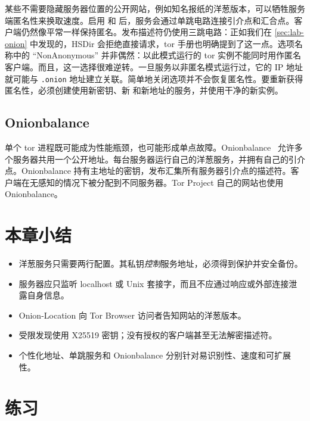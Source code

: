 某些不需要隐藏服务器位置的公开网站，例如知名报纸的洋葱版本，可以牺牲服务端匿名性来换取速度。启用  和  后，服务会通过单跳电路连接引介点和汇合点。客户端仍然像平常一样保持匿名。发布描述符仍使用三跳电路：正如我们在 \cref{sec:lab-onion} 中发现的，HSDir 会拒绝直接请求，tor 手册也明确提到了这一点。选项名称中的 \enquote{NonAnonymous} 并非偶然：以此模式运行的 tor 实例不能同时用作匿名客户端。而且，这一选择很难逆转。一旦服务以非匿名模式运行过，它的 IP 地址就可能与 \texttt{.onion} 地址建立关联。简单地关闭选项并不会恢复匿名性。要重新获得匿名性，必须创建使用新密钥、新  和新地址的服务，并使用干净的新实例。

\subsection{Onionbalance}

单个 tor 进程既可能成为性能瓶颈，也可能形成单点故障。Onionbalance~\cite{onionbalance} 允许多个服务器共用一个公开地址。每台服务器运行自己的洋葱服务，并拥有自己的引介点。Onionbalance 持有主地址的密钥，发布汇集所有服务器引介点的描述符。客户端在无感知的情况下被分配到不同服务器。Tor Project 自己的网站也使用 Onionbalance。

\section*{本章小结}
\begin{itemize}
  \item 洋葱服务只需要两行配置。其私钥\emph{控制}服务地址，必须得到保护并安全备份。
  \item 服务器应只监听 localhost 或 Unix 套接字，而且不应通过响应或外部连接泄露自身信息。
  \item Onion-Location 向 Tor Browser 访问者告知网站的洋葱版本。
  \item 受限发现使用 X25519 密钥；没有授权的客户端甚至无法解密描述符。
  \item 个性化地址、单跳服务和 Onionbalance 分别针对易识别性、速度和可扩展性。
\end{itemize}

\section*{练习}

